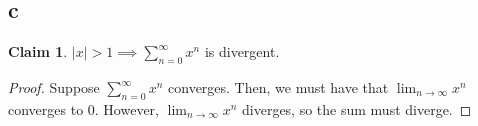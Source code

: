\documentclass[12pt,letterpaper]{article}
\theoremstyle{definition}
\newtheorem*{claim}{Claim}
\begin{document}
\subsection*{c}

\begin{claim}
  $|x| > 1 \implies \sum_{n=0}^\infty x^n$ is divergent.
\end{claim}

\begin{proof}
  Suppose $\sum_{n=0}^\infty x^n$ converges. Then, we must have that
  $\lim_{n\rightarrow \infty} x^n$ converges to 0. However,
  $\lim_{n\rightarrow \infty} x^n$ diverges, so the sum must diverge.
\end{proof}
\end{document}
